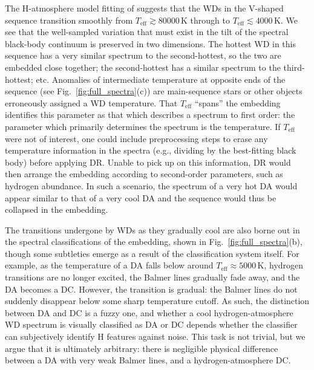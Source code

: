 \documentclass[fleqn,usenatbib]{mnras}
\def\Teff{T_\mathrm{eff}}
\begin{document}
The H-atmosphere model fitting of \citet{gentilefusillo19} suggests that the WDs in the V-shaped sequence transition smoothly from $\Teff \gtrsim 80000\,\text{K}$ through to $\Teff \lesssim 4000\,\text{K}$.
We see that the well-sampled variation that must exist in the tilt of the spectral black-body continuum is preserved in two dimensions.
The hottest WD in this sequence has a very similar spectrum to the second-hottest, so the two are embedded close together; the second-hottest has a similar spectrum to the third-hottest; etc.
Anomalies of intermediate temperature at opposite ends of the sequence (see Fig.~\ref{fig:full_spectra}(c)) are main-sequence stars or other objects erroneously assigned a WD temperature.
That $\Teff$ ``spans'' the embedding identifies this parameter as that which describes a spectrum to first order: the parameter which primarily determines the spectrum is the temperature.
If $\Teff$ were not of interest, one could include preprocessing steps to erase any temperature information in the spectra (e.g., dividing by the best-fitting black body) before applying DR.
Unable to pick up on this information, DR would then arrange the embedding according to second-order parameters, such as hydrogen abundance.
In such a scenario, the spectrum of a very hot DA would appear similar to that of a very cool DA and the sequence would thus be collapsed in the embedding.

The transitions undergone by WDs as they gradually cool are also borne out in the spectral classifications of the embedding, shown in Fig.~\ref{fig:full_spectra}(b), though some subtleties emerge as a result of the classification system itself.
For example, as the temperature of a DA falls below around $\Teff\approx 5000\,\text{K}$, hydrogen transitions are no longer excited, the Balmer lines gradually fade away, and the DA becomes a DC.
However, the transition is gradual: the Balmer lines do not suddenly disappear below some sharp temperature cutoff.
As such, the distinction between DA and DC is a fuzzy one, and whether a cool hydrogen-atmosphere WD spectrum is visually classified as DA or DC depends whether the classifier can subjectively identify H features against noise.
This task is not trivial, but we argue that it is ultimately arbitrary: there is negligible physical difference between a DA with very weak Balmer lines, and a hydrogen-atmosphere DC.

\end{document}
